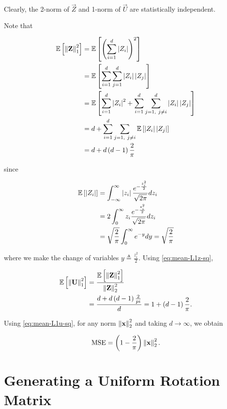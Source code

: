 \documentclass[twoside]{article}
\begin{document}
Clearly, the 2-norm of \(\vec{Z}\) and 1-norm of \(\vec{U}\) are statistically 
independent.

Note that

\begin{align}
    \mathbb{E}\left[ \left\lVert\boldsymbol{\mathbf{Z}}\right\rVert_1^2 \right] &= \mathbb{E}\left[ \left(\sum_{i=1}^d\left\vert Z_i\right\vert\right)^2 \right] \\
                              &= \mathbb{E}\left[ \sum_{i=1}^d\sum_{j=1}^d\left\vert Z_i\right\vert\left\vert Z_j\right\vert \right] \\
                              &= \mathbb{E}\left[ \sum_{i=1}^d\left\vert Z_i\right\vert^2 + \sum_{i=1}^d\sum_{j=1,\ j\neq i}^d\left\vert Z_i\right\vert\left\vert Z_j\right\vert \right] \\
                              &= d + \sum_{i=1}^d\sum_{j=1,\ j\neq i}\mathbb{E}\left[ \left\vert Z_i\right\vert\left\vert Z_j\right\vert \right] \\
                              &= d + d\left(d-1\right)\frac{2}{\pi}
                              \label{eq:mean-L1z-sq}
\end{align}

since

\begin{align}
    \mathbb{E}\left[ \left\vert Z_i\right\vert \right] &= \int_{-\infty}^{\infty}\left\vert z_i\right\vert\frac{e^{-\frac{z_i^2}{2}}}{\sqrt{2\pi}} dz_i \\
                     &= 2\int_{0}^{\infty} z_i \frac{e^{-\frac{z_i^2}{2}}}{\sqrt{2\pi}}dz_i \\
                     &= \sqrt{\frac{2}{\pi}}\int_0^{\infty}e^{-y}dy = \sqrt{\frac{2}{\pi}}
                     \label{eq:mean-absz}
\end{align}

where we make the change of variables \(y \triangleq \frac{z_i^2}{2}\). Using
\eqref{eq:mean-L1z-sq},

\begin{align}
    \mathbb{E}\left[ \left\lVert\boldsymbol{\mathbf{U}}\right\rVert_1^2 \right] &= \frac{\mathbb{E}\left[ \left\lVert\boldsymbol{\mathbf{Z}}\right\rVert_1^2 \right]}{\left\lVert\boldsymbol{\mathbf{Z}}\right\rVert_2^2} \\
                              &= \frac{d + d\left(d-1\right)\frac{2}{pi}}{d} = 1 + \left(d-1\right)\frac{2}{\pi}.
                              \label{eq:mean-L1u-sq}
\end{align}

Using \eqref{eq:mean-L1u-sq}, for any norm \(\left\lVert\boldsymbol{\mathbf{x}}\right\rVert_2^2\) and taking \(d
\to \infty\), we obtain

\begin{equation}
    \mathrm{MSE} = \left(1-\frac{2}{\pi}\right)\left\lVert\boldsymbol{\mathbf{x}}\right\rVert_2^2.
    \label{eq:mse-drive}
\end{equation}

\section{Generating a Uniform Rotation Matrix}
\end{document}
